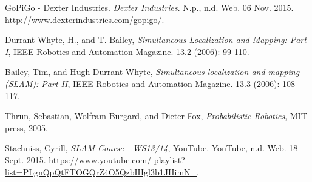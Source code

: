 \documentclass[conference]{IEEEtran}
\begin{document}

















%
%
%
\begin{thebibliography}{1}

GoPiGo - Dexter Industries. \emph{Dexter Industries}. N.p., n.d. Web. 06 Nov. 2015. \url{http://www.dexterindustries.com/gopigo/}.

Durrant-Whyte, H., and T. Bailey, \emph{Simultaneous Localization and Mapping: Part I}, IEEE Robotics and Automation Magazine. 13.2 (2006): 99-110.

Bailey, Tim, and Hugh Durrant-Whyte, \emph{Simultaneous localization and mapping (SLAM): Part II}, IEEE Robotics and Automation Magazine. 13.3 (2006): 108-117.

Thrun, Sebastian, Wolfram Burgard, and Dieter Fox, \emph{Probabilistic Robotics}, MIT press, 2005.

Stachniss, Cyrill, \emph{SLAM Course - WS13/14}, YouTube. YouTube, n.d. Web. 18 Sept. 2015. \url{https://www.youtube.com/ playlist?list=PLgnQpQtFTOGQrZ4O5QzbIHgl3b1JHimN_}.

\end{thebibliography}




\end{document}
